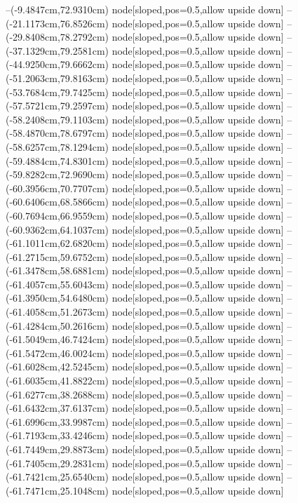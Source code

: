 --(-9.4847cm,72.9310cm) node[sloped,pos=0.5,allow upside down]{\ArrowIn}
--(-21.1173cm,76.8526cm) node[sloped,pos=0.5,allow upside down]{\ArrowIn}
--(-29.8408cm,78.2792cm) node[sloped,pos=0.5,allow upside down]{\ArrowIn}
--(-37.1329cm,79.2581cm) node[sloped,pos=0.5,allow upside down]{\ArrowIn}
--(-44.9250cm,79.6662cm) node[sloped,pos=0.5,allow upside down]{\ArrowIn}
--(-51.2063cm,79.8163cm) node[sloped,pos=0.5,allow upside down]{\ArrowIn}
--(-53.7684cm,79.7425cm) node[sloped,pos=0.5,allow upside down]{\ArrowIn}
--(-57.5721cm,79.2597cm) node[sloped,pos=0.5,allow upside down]{\ArrowIn}
--(-58.2408cm,79.1103cm) node[sloped,pos=0.5,allow upside down]{\arrowIn}
--(-58.4870cm,78.6797cm) node[sloped,pos=0.5,allow upside down]{\arrowIn}
--(-58.6257cm,78.1294cm) node[sloped,pos=0.5,allow upside down]{\arrowIn}
--(-59.4884cm,74.8301cm) node[sloped,pos=0.5,allow upside down]{\ArrowIn}
--(-59.8282cm,72.9690cm) node[sloped,pos=0.5,allow upside down]{\ArrowIn}
--(-60.3956cm,70.7707cm) node[sloped,pos=0.5,allow upside down]{\ArrowIn}
--(-60.6406cm,68.5866cm) node[sloped,pos=0.5,allow upside down]{\ArrowIn}
--(-60.7694cm,66.9559cm) node[sloped,pos=0.5,allow upside down]{\ArrowIn}
--(-60.9362cm,64.1037cm) node[sloped,pos=0.5,allow upside down]{\ArrowIn}
--(-61.1011cm,62.6820cm) node[sloped,pos=0.5,allow upside down]{\ArrowIn}
--(-61.2715cm,59.6752cm) node[sloped,pos=0.5,allow upside down]{\ArrowIn}
--(-61.3478cm,58.6881cm) node[sloped,pos=0.5,allow upside down]{\arrowIn}
--(-61.4057cm,55.6043cm) node[sloped,pos=0.5,allow upside down]{\ArrowIn}
--(-61.3950cm,54.6480cm) node[sloped,pos=0.5,allow upside down]{\arrowIn}
--(-61.4058cm,51.2673cm) node[sloped,pos=0.5,allow upside down]{\ArrowIn}
--(-61.4284cm,50.2616cm) node[sloped,pos=0.5,allow upside down]{\ArrowIn}
--(-61.5049cm,46.7424cm) node[sloped,pos=0.5,allow upside down]{\ArrowIn}
--(-61.5472cm,46.0024cm) node[sloped,pos=0.5,allow upside down]{\arrowIn}
--(-61.6028cm,42.5245cm) node[sloped,pos=0.5,allow upside down]{\ArrowIn}
--(-61.6035cm,41.8822cm) node[sloped,pos=0.5,allow upside down]{\arrowIn}
--(-61.6277cm,38.2688cm) node[sloped,pos=0.5,allow upside down]{\ArrowIn}
--(-61.6432cm,37.6137cm) node[sloped,pos=0.5,allow upside down]{\arrowIn}
--(-61.6996cm,33.9987cm) node[sloped,pos=0.5,allow upside down]{\ArrowIn}
--(-61.7193cm,33.4246cm) node[sloped,pos=0.5,allow upside down]{\arrowIn}
--(-61.7449cm,29.8873cm) node[sloped,pos=0.5,allow upside down]{\ArrowIn}
--(-61.7405cm,29.2831cm) node[sloped,pos=0.5,allow upside down]{\arrowIn}
--(-61.7421cm,25.6540cm) node[sloped,pos=0.5,allow upside down]{\ArrowIn}
--(-61.7471cm,25.1048cm) node[sloped,pos=0.5,allow upside down]{\arrowIn}
